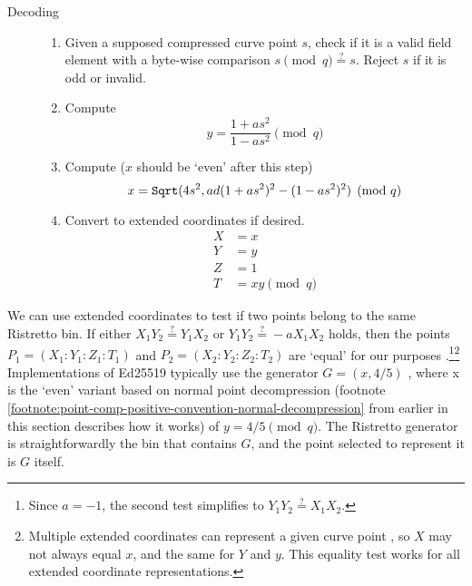 \begin{description}
    \item[Decoding] \hfill
        \begin{enumerate}
            \item Given a supposed compressed curve point $s$, check if it is a valid field element with a byte-wise comparison $s \pmod{q} \stackrel{?}{=} s$. Reject $s$ if it is odd or invalid. 
            \item Compute
            \[y = \frac{1 + a s^2}{1 - a s^2} \pmod q\]
            \item Compute ($x$ should be `even' after this step)\vspace{.155cm}
            \[x = \textrm{{\tt Sqrt}}(4 s^2, a d (1 + a s^2)^2 - (1 - a s^2)^2) \pmod q\]
            \item Convert to extended coordinates if desired.\vspace{.115cm}
            \begin{align*}
                X &= x \\
                Y &= y \\
                Z &= 1 \\
                T &= x y \pmod q
            \end{align*}
	    \end{enumerate}
\end{description}

We can use extended coordinates to test if two points belong to the same Ristretto bin. If either $X_1 Y_2 \stackrel{?}{=} Y_1 X_2$ or $Y_1 Y_2 \stackrel{?}{=} -a X_1 X_2$ holds, then the points $P_1 = (X_1 : Y_1 : Z_1 : T_1)$ and $P_2 = (X_2 : Y_2 : Z_2 : T_2)$ are `equal' for our purposes \cite{ristretto-equality}.\footnote{Since $a = -1$, the second test simplifies to $Y_1 Y_2 \stackrel{?}{=} X_1 X_2$.}\footnote{Multiple extended coordinates can represent a given curve point \cite{ristretto-what-is}, so $X$ may not always equal $x$, and the same for $Y$ and $y$. This equality test works for all extended coordinate representations.}\\

Implementations of Ed25519 typically use the generator $G = (x,4/5)$ \cite{Bernstein2012-high-speed-high-security-ed25519}, where x is the `even' variant based on normal point decompression (footnote \ref{footnote:point-comp-positive-convention-normal-decompression} from earlier in this section describes how it works) of \(y = 4/5 \pmod q\). The Ristretto generator is straightforwardly the bin that contains $G$, and the point selected to represent it is $G$ itself.




